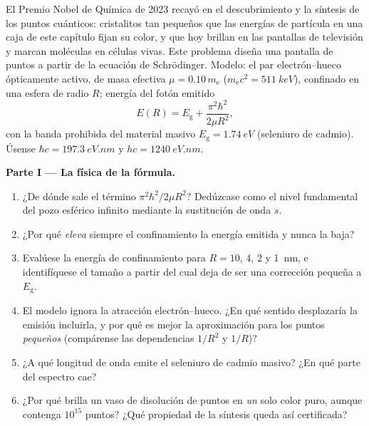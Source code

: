 \begin{problem}\label{pb:b3:schrodinger-three-dimensions:1}
El Premio Nobel de Química de 2023 recayó en el descubrimiento y la síntesis
de los puntos cuánticos: cristalitos tan pequeños que las energías de
partícula en una caja de este capítulo fijan su color, y que hoy brillan en
las pantallas de televisión y marcan moléculas en células vivas. Este
problema diseña una pantalla de puntos a partir de la ecuación de
Schrödinger. Modelo: el par electrón--hueco ópticamente activo, de masa
efectiva $\mu = 0.10\,m_{\text{e}}$
($m_{\text{e}}c^2 = \qty{511}{keV}$), confinado en una esfera de radio
$R$; energía del fotón emitido
\[
E(R) = E_{\text{g}} + \frac{\pi^2\hbar^2}{2\mu R^2} ,
\]
con la banda prohibida del material masivo $E_{\text{g}} = \qty{1.74}{eV}$
(seleniuro de cadmio). Úsense $\hbar c = \qty{197.3}{eV.nm}$ y $hc =
\qty{1240}{eV.nm}$.

\medskip\noindent\textbf{Parte I --- La física de la fórmula.}
\begin{enumerate}
  \item ¿De dónde sale el término $\pi^2\hbar^2/2\mu R^2$? Dedúzcase como
        el nivel fundamental del pozo esférico infinito mediante la
        sustitución de onda $s$.
  \item ¿Por qué \emph{eleva} siempre el confinamiento la energía emitida y
        nunca la baja?
  \item Evalúese la energía de confinamiento para $R = 10$, $4$, $2$ y
        \qty{1}{nm}, e identifíquese el tamaño a partir del cual deja de ser
        una corrección pequeña a $E_{\text{g}}$.
  \item El modelo ignora la atracción electrón--hueco. ¿En qué sentido
        desplazaría la emisión incluirla, y por qué es mejor la
        aproximación para los puntos \emph{pequeños} (compárense las
        dependencias $1/R^2$ y $1/R$)?
  \item ¿A qué longitud de onda emite el seleniuro de cadmio masivo? ¿En
        qué parte del espectro cae?
  \item ¿Por qué brilla un vaso de disolución de puntos en \emph{un} solo
        color puro, aunque contenga $10^{15}$ puntos? ¿Qué propiedad de la
        síntesis queda así certificada?
\end{enumerate}


\end{problem}
